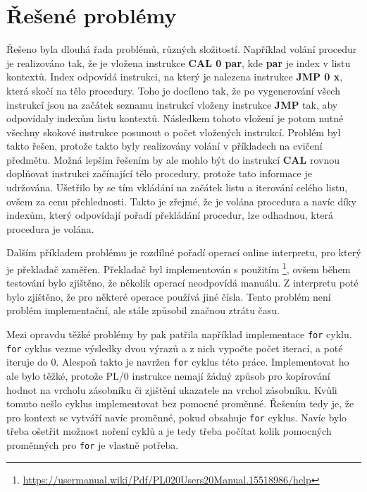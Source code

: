 \documentclass[12pt, letterpaper]{article}
\begin{document}
\section{Řešené problémy}
Řešeno byla dlouhá řada problémů, různých složitostí. Například volání procedur je realizováno tak, že je vložena
instrukce \textbf{CAL 0 par}, kde \textbf{par} je index v listu kontextů. Index odpovídá instrukci, na který je nalezena
instrukce \textbf{JMP 0 x}, která skočí na tělo procedury. Toho je docíleno tak, že po vygenerování všech instrukcí jsou
na začátek seznamu instrukcí vloženy instrukce \textbf{JMP} tak, aby odpovídaly indexům listu kontextů. Následkem tohoto
vložení je potom nutné všechny skokové instrukce posunout o počet vložených instrukcí. Problém byl takto řešen, protože
takto byly realizovány volání v příkladech na cvičení předmětu. Možná lepším řešením by ale mohlo být do instrukcí 
\textbf{CAL} rovnou doplňovat instrukci začínající tělo procedury, protože tato informace je udržována. Ušetřilo by
se tím vkládání na začátek listu a iterování celého listu, ovšem za cenu přehlednosti. Takto je zřejmé, že je volána
procedura a navíc díky indexům, který odpovídají pořadí překládání procedur, lze odhadnou, která procedura je volána.

Dalším příkladem problému je rozdílné pořadí operací online interpretu, pro který je překladač zaměřen. Překladač byl
implementován s použitím \footnote{\url{https://usermanual.wiki/Pdf/PL020Users20Manual.15518986/help}},
ovšem během testování bylo zjištěno, že několik operací neodpovídá manuálu. Z interpretu poté bylo zjištěno, že pro
některé operace používá jiné čísla. Tento problém není problém implementační, ale stále způsobil značnou ztrátu času.

Mezi opravdu těžké problémy by pak patřila například implementace \texttt{for} cyklu. \texttt{for} cyklus vezme 
výsledky dvou výrazů a z nich vypočte počet iterací, a poté iteruje do 0. Alespoň takto je navržen \texttt{for} cyklus
této práce. Implementovat ho ale bylo těžké, protože PL/0 instrukce nemají žádný způsob pro kopírování hodnot na 
vrcholu zásobníku či zjištění ukazatele na vrchol zásobníku. Kvůli tomuto nešlo cyklus implementovat bez pomocné 
proměnné. Řešením tedy je, že pro kontext se vytváří navíc proměnné, pokud obsahuje \texttt{for} cyklus. Navíc bylo
třeba ošetřit možnost noření cyklů a je tedy třeba počítat kolik pomocných proměnných pro \texttt{for} je 
vlastně potřeba.
%
\end{document}
